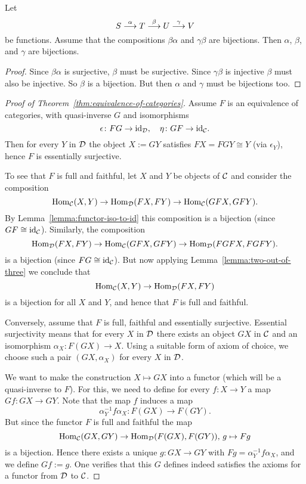 \begin{lemma}\label{lemma:two-out-of-three}
Let 
\[
	S \overset\alpha{\longrightarrow} T \overset\beta{\longrightarrow} U \overset\gamma{\longrightarrow} V
\]
be functions. Assume that the compositions $\beta\alpha$ and $\gamma\beta$ are bijections. Then $\alpha$, $\beta$, and $\gamma$ are bijections.
\end{lemma}

\begin{proof}
Since $\beta\alpha$ is surjective, $\beta$ must be surjective. Since $\gamma\beta$ is injective $\beta$ must also be injective. So $\beta$ is a bijection. But then $\alpha$ and $\gamma$ must be bijections too.
\end{proof}



\begin{proof}[Proof of Theorem~\ref{thm:equivalence-of-categories}]
Assume $F$ is an equivalence of categories, with quasi-inverse $G$ and isomorphisms
\[
	\epsilon\colon FG \to {\rm id}_{\mathcal{D}},\quad \eta\colon GF\to {\rm id}_{\mathcal{C}}.
\]
Then for every $Y$ in ${\mathcal{D}}$ the object $X := GY$ satisfies $FX = FGY \cong Y$ (via $\epsilon_Y$), hence $F$ is essentially surjective. 

To see that $F$ is full and faithful, let $X$ and $Y$ be objects of ${\mathcal{C}}$ and consider
the composition
\[
	\operatorname{Hom}_{{\mathcal{C}}}(X,Y) \to \operatorname{Hom}_{{\mathcal{D}}}(FX,FY) \to \operatorname{Hom}_{{\mathcal{C}}}(GFX,GFY).
\]
By Lemma~\ref{lemma:functor-iso-to-id} this composition is a bijection (since $GF\cong {\rm id}_{\mathcal{C}}$). Similarly, the composition
\[
	\operatorname{Hom}_{{\mathcal{D}}}(FX,FY) \to \operatorname{Hom}_{{\mathcal{C}}}(GFX,GFY) \to \operatorname{Hom}_{{\mathcal{D}}}(FGFX,FGFY).
\]
is a bijection (since $FG\cong {\rm id}_{{\mathcal{C}}}$). But now applying Lemma~\ref{lemma:two-out-of-three} we conclude that 
\[
	\operatorname{Hom}_{{\mathcal{C}}}(X,Y) \to \operatorname{Hom}_{{\mathcal{D}}}(FX,FY)
\]
is a bijection for all $X$ and $Y$, and hence that $F$ is full and faithful.



Conversely, assume that $F$ is full, faithful and essentially surjective. Essential surjectivity means that for every $X$ in ${\mathcal{D}}$ there exists an object $GX$ in ${\mathcal{C}}$ and an isomorphism $\alpha_{X}\colon F(GX) \to X$. Using a suitable form of axiom of choice, we choose such a pair $(GX, \alpha_X)$ for every $X$ in ${\mathcal{D}}$.

We want to make the construction $X \mapsto GX$ into a functor (which will be a quasi-inverse to $F$). For this, we need to define for every $f\colon X\to Y$  a map $Gf\colon GX \to GY$. Note that the map $f$ induces a map
\[
	 \alpha_Y^{-1} f\alpha_X \colon F(GX) \to F(GY).
\]
But since the functor $F$ is full and faithful the map
\[
	\operatorname{Hom}_{{\mathcal{C}}}(GX,GY) \to \operatorname{Hom}_{\mathcal{D}}(F(GX),F(GY)),\, g \mapsto Fg
\]
is a bijection. Hence there exists a unique $g \colon GX \to GY$ with $Fg = \alpha_Y^{-1} f \alpha_X$, and we define $Gf := g$. One verifies that this $G$ defines indeed satisfies the axioms for a functor from ${\mathcal{D}}$ to ${\mathcal{C}}$.


\end{proof}
